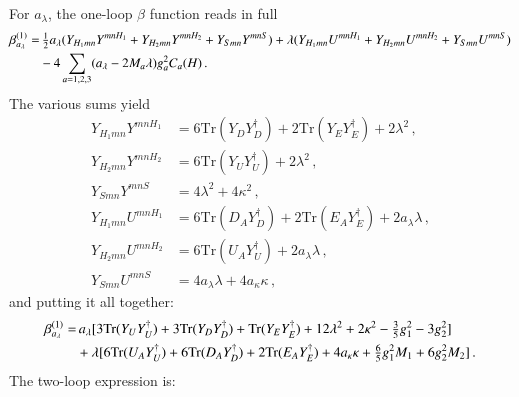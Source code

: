 \documentclass[final,3p,times,pdflatex]{elsarticle}
\newcommand{\lamsq}{\lambda^2}
\newcommand{\kapsq}{\kappa^2}
\newcommand{\tr}{\mathrm{Tr}}
\begin{document}
For $a_\lambda$, the one-loop $\beta$ function reads in full
%
\begin{align}
\beta_{a_\lambda}^{(1)} =&\, \tfrac{1}{2}a_\lambda (Y_{H_1mn}Y^{mnH_1} + Y_{H_2mn}Y^{mnH_2}
 + Y_{Smn}Y^{mnS}) + \lambda (Y_{H_1mn}U^{mnH_1} + Y_{H_2mn}U^{mnH_2} 
+ Y_{Smn}U^{mnS}) \notag \\
%
&- 4\sum_{a=1,2,3} (a_\lambda - 2M_a\lambda)g_a^2C_a(H)\,.
\end{align}
%
The various sums yield
%
\begin{align}
Y_{H_1mn}Y^{mnH_1} &= 6\tr( Y_D  Y_D^\dagger) + 2\tr( Y_E  Y_E^\dagger) + 2\lamsq\,, \\
%
Y_{H_2mn}Y^{mnH_2} &= 6\tr( Y_U  Y_U^\dagger) + 2\lamsq\,, \label{eqn:YH2sq} \\
%
Y_{Smn}Y^{mnS} &= 4\lamsq + 4\kapsq\,, \\
%
Y_{H_1mn}U^{mnH_1} &= 6\tr( D_A  Y_D^\dagger) + 2\tr( E_A  Y_E^\dagger) 
+ 2a_\lambda\lambda\,, \\
%
Y_{H_2mn}U^{mnH_2} &= 6\tr( U_A  Y_U^\dagger) + 2a_\lambda\lambda\,, \\
%
Y_{Smn}U^{mnS} &= 4a_\lambda\lambda + 4a_\kappa\kappa\,,
\end{align}
%
and putting it all together:
%
\begin{align}
\beta_{a_\lambda}^{(1)} =&\, a_\lambda[3\tr( Y_U  Y_U^\dagger) + 3\tr( Y_D  Y_D^\dagger) 
+ \tr( Y_E  Y_E^\dagger) + 12\lamsq + 2\kapsq - \tfrac{3}{5}g_1^2 - 3g_2^2] 
\notag \\
%
&+ \lambda[6\tr( U_A  Y_U^\dagger) + 6\tr( D_A  Y_D^\dagger) + 2\tr( E_A  Y_E^\dagger)
+ 4a_\kappa\kappa + \tfrac{6}{5}g_1^2M_1 + 6g_2^2M_2]\,.
\end{align}
%
The two-loop expression is:
\end{document}
